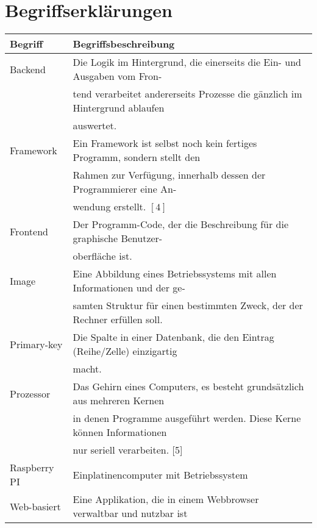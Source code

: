 \section*{Begriffserklärungen}
\begin{table}[H]
    \begin{tabular}{l|l}
         \textbf{Begriff}& \textbf{Begriffsbeschreibung}\\
         \hline
         Backend&               Die Logik im Hintergrund, die einerseits die Ein- und Ausgaben vom Fron-\\
         &                      tend verarbeitet andererseits Prozesse die gänzlich im Hintergrund ablaufen\\
         &                      auswertet.\\
         Framework&             Ein Framework ist selbst noch kein fertiges Programm, sondern stellt den\\
         &                      Rahmen zur Verfügung, innerhalb dessen der Programmierer eine An-\\
         &                      wendung erstellt. $[4]$\\
         Frontend&              Der Programm-Code, der die Beschreibung für die graphische Benutzer-\\
         &                      oberfläche ist.\\
         Image&                 Eine Abbildung eines Betriebssystems mit allen Informationen und der ge-\\
         &                      samten Struktur für einen bestimmten Zweck, der der Rechner erfüllen soll.\\     
         Primary-key&           Die Spalte in einer Datenbank, die den Eintrag (Reihe/Zelle) einzigartig\\
         &                      macht.\\
         Prozessor&             Das Gehirn eines Computers, es besteht grundsätzlich aus mehreren Kernen\\
         &                      in denen Programme ausgeführt werden. Diese Kerne können Informationen\\
         &                      nur seriell verarbeiten. [5]\\
         Raspberry PI&          Einplatinencomputer mit Betriebssystem\\
         Web-basiert&           Eine Applikation, die in einem Webbrowser verwaltbar und nutzbar ist\\
    \end{tabular}
    \label{tab:begriffserklaerungen}
\end{table}